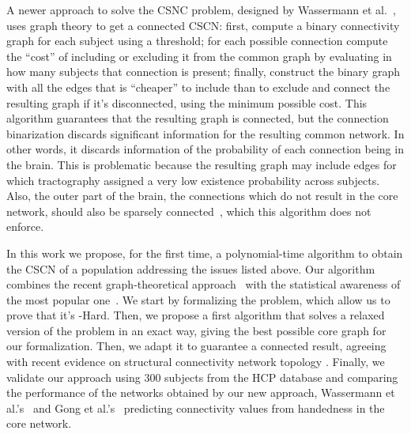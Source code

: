 A newer approach to solve the CSNC problem, designed by Wassermann et al.~\cite{Wassermann2016}, uses graph theory to get a connected CSCN: first, compute a binary connectivity graph for each subject using a threshold;  for each possible connection compute the ``cost'' of including or excluding it from the common graph by evaluating in how many subjects that connection is present; finally, construct the binary graph with all the edges that is ``cheaper'' to include than to exclude and connect the resulting graph if it's disconnected, using the minimum possible cost. This algorithm guarantees that the resulting graph is connected, but the connection binarization discards significant information for the resulting common network. In other words, it discards information of the probability of each connection being in the brain. This is problematic because the resulting graph may include edges for which tractography assigned a very low existence probability across subjects. Also, the outer part of the brain, the connections which do not result in the core network, should also be sparsely connected~\cite{Bassett2013}, which this algorithm does not enforce.

In this work we propose, for the first time, a polynomial-time algorithm to obtain the CSCN of a population  addressing the issues listed above. Our algorithm combines the recent graph-theoretical approach~\cite{Wassermann2016} with the statistical awareness of the most popular one~\cite{Gong2009}. We start by formalizing the problem, which allow us to prove that it's \NP-Hard. Then, we propose a first algorithm that solves a relaxed version of the problem in an exact way, giving the best possible core graph for our formalization. Then, we adapt it to guarantee a connected result, agreeing with recent evidence on structural connectivity network topology \cite[e.g.]{Bassett2013}. Finally, we validate our approach using 300 subjects from the HCP database and comparing the performance of the networks obtained by our new approach, Wassermann et al.'s~\cite{Wassermann2016} and Gong et al.'s~\cite{Gong2009} predicting connectivity values from handedness in the core network.